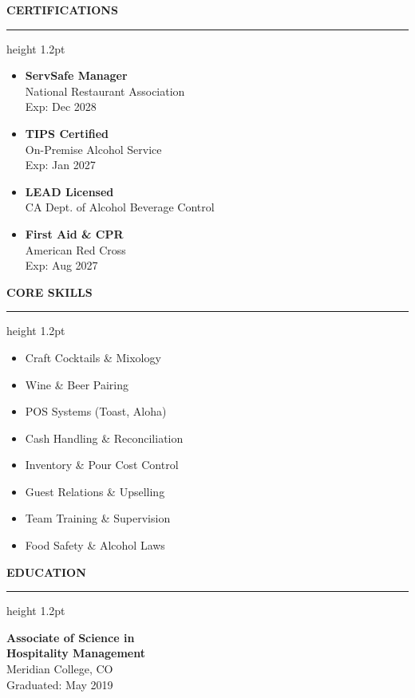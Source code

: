 \documentclass[10pt]{article}
\newcommand{\resumesection}[1]{%
  \vspace{10pt}%
  {\color{accent}\large\bfseries\MakeUppercase{#1}}%
  \vspace{3pt}%
  {\color{accent}\hrule height 1.2pt}%
  \vspace{6pt}%
}
\begin{document}
\hfill%
\begin{minipage}[t]{0.32\textwidth}
  \resumesection{Certifications}
  \begin{itemize}[leftmargin=8pt, itemsep=6pt]
    \item \textbf{ServSafe Manager} \\
      {\small National Restaurant Association \\ Exp: Dec 2028}
    \item \textbf{TIPS Certified} \\
      {\small On-Premise Alcohol Service \\ Exp: Jan 2027}
    \item \textbf{LEAD Licensed} \\
      {\small CA Dept. of Alcohol Beverage Control}
    \item \textbf{First Aid \& CPR} \\
      {\small American Red Cross \\ Exp: Aug 2027}
  \end{itemize}

  \resumesection{Core Skills}
  \begin{itemize}[leftmargin=8pt, itemsep=4pt]
    \item Craft Cocktails \& Mixology
    \item Wine \& Beer Pairing
    \item POS Systems (Toast, Aloha)
    \item Cash Handling \& Reconciliation
    \item Inventory \& Pour Cost Control
    \item Guest Relations \& Upselling
    \item Team Training \& Supervision
    \item Food Safety \& Alcohol Laws
  \end{itemize}

  \resumesection{Education}
  \noindent\textbf{Associate of Science in \\ Hospitality Management} \\
  {\small Meridian College, CO \\ Graduated: May 2019}
\end{minipage}
\end{document}

